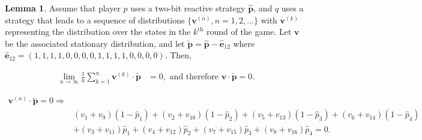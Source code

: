 \documentclass{article}
\theoremstyle{definition}
\newtheorem{lemma}[theorem]{Lemma}
\begin{document}
\begin{lemma}\label{lemma:akin_extended}
  Assume that player \(p\) uses a two-bit reactive strategy \(\mathbf{\hat{p}}\),
  and \(q\) uses a strategy that leads to a sequence
  of distributions \(\{\mathbf{v}^{(n)}, n = 1, 2, ...\}\) with
  \(\mathbf{v}^{(k)}\) representing the distribution over the states in the
  \(k^{\text{th}}\) round of the game. Let \(\mathbf{v}\) be the associated
  stationary distribution, and let \(\mathbf{\tilde{p}} = \mathbf{\hat{p}} - \mathbf{\hat{e}}_{1 2}\)
  where \(\mathbf{\hat{e}}_{1 2} = (1, 1, 1, 1, \allowbreak 0,
  0, 0, 0, 1, 1, 1, 1, 0, 0, 0, 0)\). Then,

  \begin{align*}
    \lim_{n \rightarrow \infty} \frac{1}{n} \sum_{k=1}^{n} \mathbf{v}^{(k)} \cdot\mathbf{\tilde{p}} & = 0, \text{ and therefore } \mathbf{v} \cdot \mathbf{\tilde{p}} = 0.
  \end{align*}

  \begin{align}\label{eq:akin_extended}
  \mathbf{v}^{(n)} \cdot \mathbf{\tilde{p}} = 0 \Rightarrow & \nonumber \\
  & (v_{1} + v_{9}) (1 - \hat{p}_1) + (v_{2} + v_{10}) (1 - \hat{p}_2)  + (v_{5} + v_{13}) (1 - \hat{p}_3) + (v_{6} + v_{14}) (1 - \hat{p}_4) \nonumber \\
  & + (v_{3} + v_{11})\hat{p}_1  + (v_{4} + v_{12})\hat{p}_2 + (v_{7} + v_{15}) \hat{p}_3 + (v_{8} + v_{16}) \hat{p}_4 = 0.
  \end{align}
\end{lemma}
\end{document}
